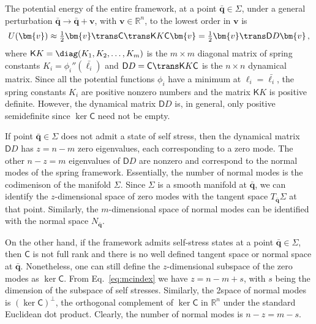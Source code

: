 The potential energy of the entire framework, at a point $\bar{\bm{q}} \in \Sigma$, under a general perturbation $\bar{\bm{q}} \to \bar{\bm{q}} + \bm{v}$, with $\bm{v} \in \mathbb{R}^n$, to the lowest order in $\bm{v}$ is
\begin{equation}
  U(\bm{v}) \approx \tfrac{1}{2}\bm{v}\trans\mathsf{C}\trans\mathsf{K}K\mathsf{C}\bm{v} = \tfrac{1}{2}\bm{v}\trans\mathsf{D}D\bm{v}\,,\label{eq:energy1}
\end{equation}
where $\mathsf{K}K = \diag(K_1, K_2, \ldots, K_m)$ is the $m\times m$ diagonal matrix of spring constants $K_i = \phi_i''(\bar{\ell_i})$ and $\mathsf{D}D = \mathsf{C}\trans\mathsf{K}K\mathsf{C}$ is the $n\times n$ dynamical matrix.
Since all the potential functions $\phi_i$ have a minimum at $\ell_i = \bar{\ell_i}$, the spring constants $K_i$ are positive nonzero numbers and the matrix $\mathsf{K}K$ is positive definite.
However, the dynamical matrix $\mathsf{D}D$ is, in general, only positive semidefinite since $\ker{\mathsf{C}}$ need not be empty.

If point $\bar{\bm{q}} \in \Sigma$ does not admit a state of self stress, then the dynamical matrix $\mathsf{D}D$ has $z = n - m$ zero eigenvalues, each corresponding to a zero mode.
The other $n - z = m$ eigenvalues of $\mathsf{D}D$ are nonzero and correspond to the normal modes of the spring framework.
Essentially, the number of normal modes is the codimenison of the manifold $\Sigma$.
Since $\Sigma$ is a smooth manifold at $\bar{\bm{q}}$, we can identify the $z$-dimensional space of zero modes with the tangent space $T_{\bar{\bm{q}}}\Sigma$ at that point.
Similarly, the $m$-dimensional space of normal modes can be identified with the normal space $N_{\bar{\bm{q}}}$.

On the other hand, if the framework admits self-stress states at a point $\bar{\bm{q}} \in \Sigma$, then $\mathsf{C}$ is not full rank and there is no well defined tangent space or normal space at $\bar{\bm{q}}$.
Nonetheless, one can still define the $z$-dimensional subspace of the zero modes as $\ker{\mathsf{C}}$.
From Eq.~\eqref{eq:mcindex} we have $z = n - m + s$, with $s$ being the dimension of the subspace of self stresses.
Similarly, the 2space of normal modes is $(\ker \mathsf{C})^\perp$, the orthogonal complement of $\ker{\mathsf{C}}$ in $\mathbb{R}^n$ under the standard Euclidean dot product.
Clearly, the number of normal modes is $n - z = m - s$.

